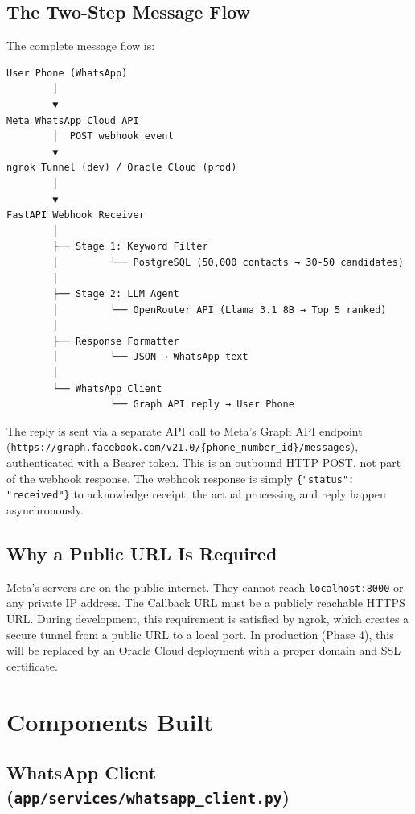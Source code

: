 \documentclass[12pt, a4paper]{report}
\begin{document}
\subsection{The Two-Step Message Flow}

The complete message flow is:

\begin{verbatim}
User Phone (WhatsApp)
        │
        ▼
Meta WhatsApp Cloud API
        │  POST webhook event
        ▼
ngrok Tunnel (dev) / Oracle Cloud (prod)
        │
        ▼
FastAPI Webhook Receiver
        │
        ├── Stage 1: Keyword Filter
        │         └── PostgreSQL (50,000 contacts → 30-50 candidates)
        │
        ├── Stage 2: LLM Agent
        │         └── OpenRouter API (Llama 3.1 8B → Top 5 ranked)
        │
        ├── Response Formatter
        │         └── JSON → WhatsApp text
        │
        └── WhatsApp Client
                  └── Graph API reply → User Phone
\end{verbatim}

The reply is sent via a separate API call to Meta's Graph API endpoint (\texttt{https://graph.facebook.com/v21.0/\{phone\_number\_id\}/messages}), authenticated with a Bearer token. This is an outbound HTTP POST, not part of the webhook response. The webhook response is simply \texttt{\{"status": "received"\}} to acknowledge receipt; the actual processing and reply happen asynchronously.

\subsection{Why a Public URL Is Required}

Meta's servers are on the public internet. They cannot reach \texttt{localhost:8000} or any private IP address. The Callback URL must be a publicly reachable HTTPS URL. During development, this requirement is satisfied by ngrok, which creates a secure tunnel from a public URL to a local port. In production (Phase 4), this will be replaced by an Oracle Cloud deployment with a proper domain and SSL certificate.

\section{Components Built}

\subsection{WhatsApp Client (\texttt{app/services/whatsapp\_client.py})}
\end{document}
